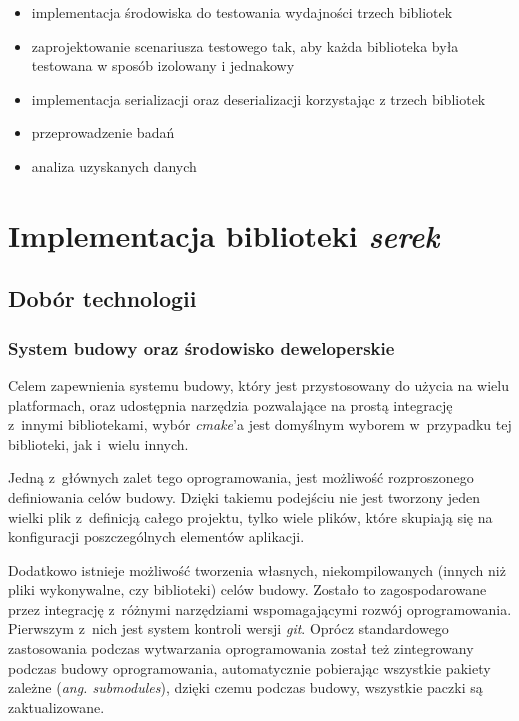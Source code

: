 \documentclass[12pt]{article}
\newcommand{\n}{\newline}
\newcommand{\nonpl}[1]{{\it #1}}
\newcommand{\ang}[1]{\nonpl{ang. #1}}
\newcommand{\serek}{\nonpl{serek}}
\begin{document}
{{			\begin{itemize}
				\setlength\itemsep{0mm}
				\item implementacja środowiska do testowania wydajności trzech bibliotek
				\item zaprojektowanie scenariusza testowego tak, aby każda biblioteka była testowana w sposób izolowany i jednakowy
				\item implementacja serializacji oraz deserializacji korzystając z trzech bibliotek
				\item przeprowadzenie badań
				\item analiza uzyskanych danych
			\end{itemize}
		}

	}

	{
		\section{Implementacja biblioteki \serek}\label{serek}

		{
			\subsection{Dobór technologii}

			{
				\subsubsection{System budowy oraz środowisko deweloperskie}

				Celem zapewnienia systemu budowy, który jest przystosowany do użycia na wielu platformach, oraz udostępnia narzędzia pozwalające na prostą
				integrację z~innymi bibliotekami, wybór \nonpl{cmake}'a\cite{cmake_docs} jest domyślnym wyborem w~przypadku tej biblioteki, jak i~wielu innych.\n

				Jedną z~głównych zalet tego oprogramowania, jest możliwość rozproszonego definiowania celów budowy. Dzięki takiemu podejściu nie jest tworzony
				jeden wielki plik z~definicją całego projektu, tylko wiele plików, które skupiają się na konfiguracji poszczególnych elementów aplikacji.\n

				Dodatkowo istnieje możliwość tworzenia własnych, niekompilowanych (innych niż pliki wykonywalne, czy biblioteki) celów budowy. Zostało to zagospodarowane
				przez integrację z~różnymi narzędziami wspomagającymi rozwój oprogramowania. Pierwszym z~nich jest system kontroli wersji \nonpl{git}\cite{git_docs}. Oprócz standardowego
				zastosowania podczas wytwarzania oprogramowania został też zintegrowany podczas budowy oprogramowania, automatycznie pobierając wszystkie pakiety zależne
				(\ang{submodules}), dzięki czemu podczas budowy, wszystkie paczki są zaktualizowane.\n

}}}
\end{document}
